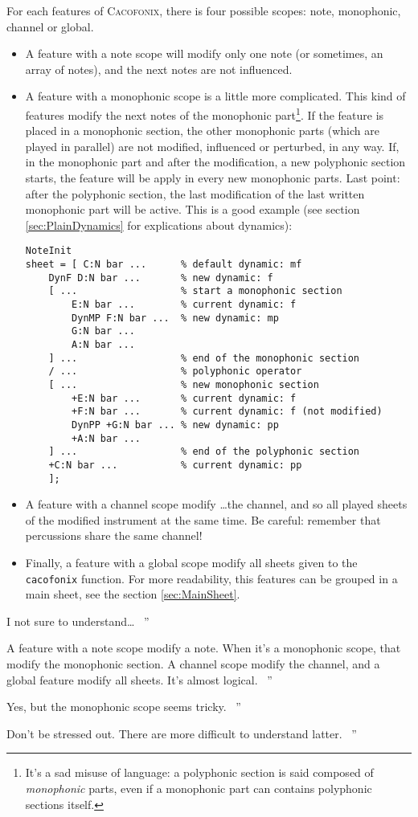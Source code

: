 \documentclass{article}
\newcommand\cacofonix{\textsc{Cacofonix}\xspace}
\newenvironment{meenv}{ \par \noindent \makebox[6em][r]{ \textcolor{mecolor}{Me}: `` --~}}{~''}
\newenvironment{myselfenv}{ \par \noindent \makebox[6em][r]{ \textcolor{myselfcolor}{Myself}: `` --~}}{~''}
\newcommand{ \me }[1]{%
\begin{meenv}%
	#1%
\end{meenv} }
\newcommand{ \myself }[1]{%
\begin{myselfenv}%
	#1%
\end{myselfenv} }
\begin{document}
For each features of \cacofonix, there is four possible scopes: note, monophonic, channel or global.
\begin{itemize}
	\item A feature with a note scope will modify only one note (or sometimes, an array of notes), and the next notes are not influenced.
	\item A feature with a monophonic scope is a little more complicated. This kind of features modify the next notes of the monophonic part\footnote{It's a sad misuse of language: a polyphonic section is said composed of \emph{monophonic} parts, even if a monophonic part can contains polyphonic sections itself.}. If the feature is placed in a monophonic section, the other monophonic parts (which are played in parallel) are not modified, influenced or perturbed, in any way. If, in the monophonic part and after the modification, a new polyphonic section starts, the feature will be apply in every new monophonic parts. Last point: after the polyphonic section, the last modification of the last written monophonic part will be active. This is a good example (see section \ref{sec:PlainDynamics} for explications about dynamics):
\begin{lstlisting}
NoteInit
sheet = [ C:N bar ...      % default dynamic: mf
	DynF D:N bar ...       % new dynamic: f
	[ ...                  % start a monophonic section
		E:N bar ...        % current dynamic: f
		DynMP F:N bar ...  % new dynamic: mp
		G:N bar ... 
		A:N bar ...
	] ...                  % end of the monophonic section
	/ ...                  % polyphonic operator
	[ ...                  % new monophonic section
		+E:N bar ...       % current dynamic: f
		+F:N bar ...       % current dynamic: f (not modified)
		DynPP +G:N bar ... % new dynamic: pp
		+A:N bar ...
	] ...                  % end of the polyphonic section
	+C:N bar ...           % current dynamic: pp
	];
\end{lstlisting}
	\item A feature with a channel scope modify \dots the channel, and so all played sheets of the modified instrument at the same time. Be careful: remember that percussions share the same channel!
	\item Finally, a feature with a global scope modify all sheets given to the \lstinline!cacofonix! function. For more readability, this features can be grouped in a main sheet, see the section \ref{sec:MainSheet}.
\end{itemize}

\me{I not sure to understand\dots}
\myself{A feature with a note scope modify a note. When it's a monophonic scope, that modify the monophonic section. A channel scope modify the channel, and a global feature modify all sheets. It's almost logical.}
\me{Yes, but the monophonic scope seems tricky.}
\myself{Don't be stressed out. There are more difficult to understand latter.}
\end{document}
